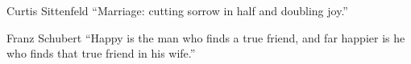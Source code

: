 \begin{aquote}{Curtis Sittenfeld}
    ``Marriage: cutting sorrow in half and doubling joy.''
\end{aquote}
\begin{aquote}{Franz Schubert}
    ``Happy is the man who finds a true friend, and far happier is he who finds that true friend in his wife.''
\end{aquote}
